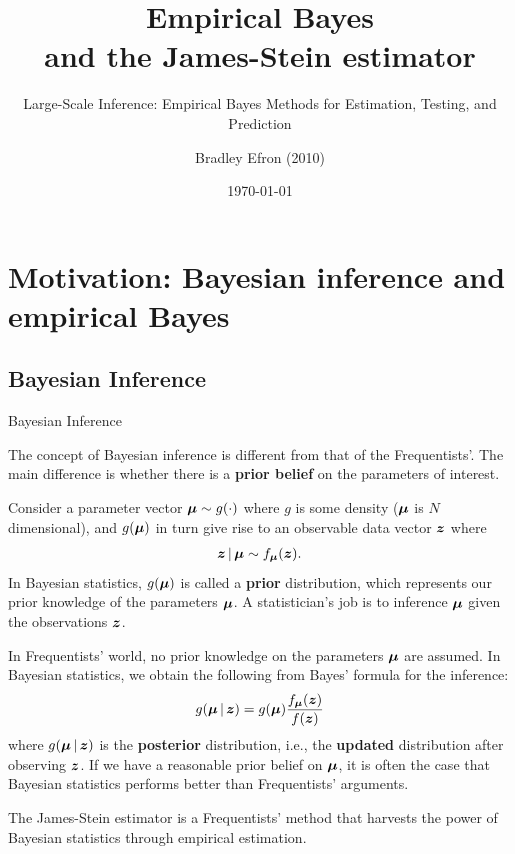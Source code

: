 \documentclass{beamer}
\title{\textbf{Empirical Bayes\\and the James-Stein estimator}}
\subtitle{Large-Scale Inference: Empirical Bayes Methods for Estimation, Testing, and Prediction}
\author{Bradley Efron (2010)}
\date{\today}
\begin{document}
\begin{frame}
	\maketitle
\end{frame}

\begin{frame}
	\tableofcontents
\end{frame}

\section{Motivation: Bayesian inference and empirical Bayes}

\subsection{Bayesian Inference}

\begin{frame}{Bayesian Inference}
	\begin{block}{}
		The concept of Bayesian inference is different from that of the
		Frequentists'.  The main difference is whether there is a
		\textbf{prior belief} on the parameters of interest.
	\end{block}
	Consider a parameter vector $\boldsymbol{\mu}\sim g(\cdot)$ where $g$ is some density
	($\boldsymbol{\mu}$ is $N$ dimensional),
	and $g(\boldsymbol{\mu})$ in turn give rise to an observable data vector $\boldsymbol{z}$ where
	\begin{align*}
		\boldsymbol{z}\,|\,\boldsymbol{\mu} \sim f_{\boldsymbol{\mu}}(\boldsymbol{z}).
	\end{align*}
	In Bayesian statistics, $g(\boldsymbol{\mu})$ is called a \textbf{prior} distribution,
	which represents our prior knowledge of the parameters $\boldsymbol{\mu}$.
	A statistician's job is to inference $\boldsymbol{\mu}$ given the observations $\boldsymbol{z}$.
\end{frame}

\begin{frame}{}
	In Frequentists' world,
	no prior knowledge on the parameters $\boldsymbol{\mu}$ are assumed.
	In Bayesian statistics, we obtain the following from Bayes' formula
	for the inference:
	\begin{align*}
		g(\boldsymbol{\mu}\,|\, \boldsymbol{z}) = g(\boldsymbol{\mu}) \frac{f_{\boldsymbol{\mu}}(\boldsymbol{z})}{f(\boldsymbol{z})}
	\end{align*}
	where $g(\boldsymbol{\mu}\,|\, \boldsymbol{z})$ is the \textbf{posterior} distribution, i.e.,
	the \textbf{updated} distribution after observing $\boldsymbol{z}$.
	If we have a reasonable prior belief on $\boldsymbol{\mu}$,
	it is often the case that Bayesian statistics performs better than
	Frequentists' arguments.
	\begin{block}{}
		The James-Stein estimator
		is a Frequentists' method that harvests the power of Bayesian
		statistics through empirical estimation.
	\end{block}
\end{frame}
\end{document}
